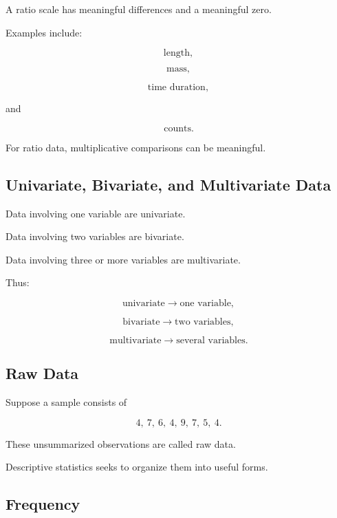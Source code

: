 A ratio scale has meaningful differences and a meaningful zero.

Examples include:

\[
\text{length},
\]

\[
\text{mass},
\]

\[
\text{time duration},
\]

and

\[
\text{counts}.
\]

For ratio data, multiplicative comparisons can be meaningful.

\subsection{Univariate, Bivariate, and Multivariate Data}
\label{subsec:univariate-bivariate-multivariate}

Data involving one variable are univariate.

Data involving two variables are bivariate.

Data involving three or more variables are multivariate.

Thus:

\[
\boxed{
\text{univariate}
\rightarrow
\text{one variable},
}
\]

\[
\boxed{
\text{bivariate}
\rightarrow
\text{two variables},
}
\]

\[
\boxed{
\text{multivariate}
\rightarrow
\text{several variables}.
}
\]

\subsection{Raw Data}
\label{subsec:raw-data}

Suppose a sample consists of

\[
4,\ 7,\ 6,\ 4,\ 9,\ 7,\ 5,\ 4.
\]

These unsummarized observations are called raw data.

Descriptive statistics seeks to organize them into useful forms.

\subsection{Frequency}
\label{subsec:frequency}

